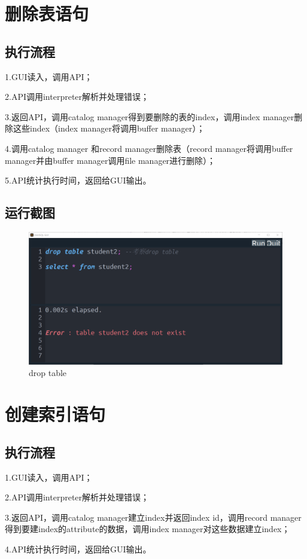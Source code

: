 \documentclass[UTF8]{ctexrep} %
\begin{document}
\section{删除表语句}
\subsection{执行流程}
1.GUI读入，调用API；
\par
2.API调用interpreter解析并处理错误；
\par
3.返回API，调用catalog manager得到要删除的表的index，调用index manager删除这些index（index manager将调用buffer manager）；
\par
4.调用catalog manager 和record manager删除表（record manager将调用buffer manager并由buffer manager调用file manager进行删除）；
\par
5.API统计执行时间，返回给GUI输出。
\subsection{运行截图}
\begin{figure}[H]
    \centering
    \includegraphics[width=0.8\linewidth]{figure/2.1.png}
    \caption{drop table}
    \label{fig:runtime2.1}
\end{figure}
\section{创建索引语句}
\subsection{执行流程}
1.GUI读入，调用API；
\par
2.API调用interpreter解析并处理错误；
\par
3.返回API，调用catalog manager建立index并返回index id，调用record manager得到要建index的attribute的数据，调用index manager对这些数据建立index；
\par
4.API统计执行时间，返回给GUI输出。
\end{document}
